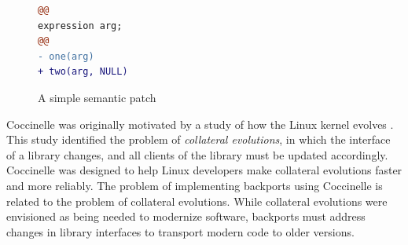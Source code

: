 \begin{figure}
\begin{lstlisting}[language=diff]
@@
expression arg;
@@
- one(arg)
+ two(arg, NULL)
\end{lstlisting}
\caption{A simple semantic patch}
\label{fig:sp1}
\end{figure}

Coccinelle was originally motivated by a study of how the Linux kernel
evolves \cite{Padioleau:eurosys06}.  This study identified the problem of
{\em collateral evolutions}, in which the interface of a library changes,
and all clients of the library must be updated accordingly.  Coccinelle was
designed to help Linux developers make collateral evolutions faster and
more reliably.  The problem of implementing backports using Coccinelle is
related to the problem of collateral evolutions.  While collateral
evolutions were envisioned as being needed to modernize software, backports
must address changes in library interfaces to transport modern code to
older versions.


